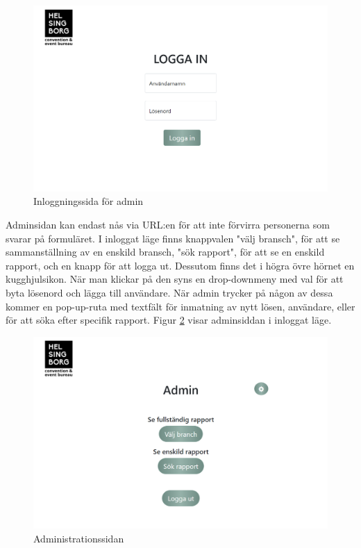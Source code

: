 \documentclass[12pt]{article}
\begin{document}
 \begin{figure}[H]
    \centering
    \includegraphics[width=12cm]{images/admin_log_in.png}
    \caption{Inloggningssida för admin}
    \label{fig:admin_login}
\end{figure}

Adminsidan kan endast nås via URL:en för att inte förvirra personerna som svarar på formuläret. I inloggat läge finns knappvalen "välj bransch", för att se sammanställning av en enskild bransch, "sök rapport", för att se en enskild rapport, och en knapp för att logga ut. Dessutom finns det i högra övre hörnet en kugghjulsikon. När man klickar på den syns en drop-downmeny med val för att byta lösenord och lägga till användare. När admin trycker på någon av dessa kommer en pop-up-ruta med textfält för inmatning av nytt lösen, användare, eller för att söka efter specifik rapport. Figur \ref{fig:admin_index} visar adminsiddan i inloggat läge.

\begin{figure}[H]
    \centering
    \includegraphics[width=12cm]{images/admin_index.png}
    \caption{Administrationssidan}
    \label{fig:admin_index}
\end{figure}
\end{document}
